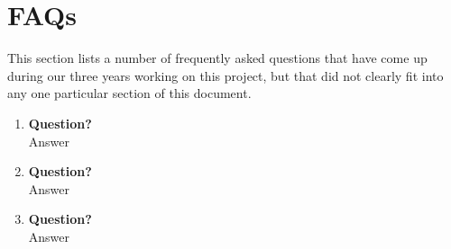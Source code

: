 \newcommand\faq[2]{\item \textbf{#1} \\ {#2}}

\chapter{FAQs}
\label{sec:app-faq}

This section lists a number of frequently asked questions that have come up during our three years working on this project, but that did not clearly fit into any one particular section of this document. \\

\begin{enumerate}

\faq{Question?}{Answer}

\faq{Question?}{Answer}

\faq{Question?}{Answer}

\end{enumerate}

\clearpage
\newpage